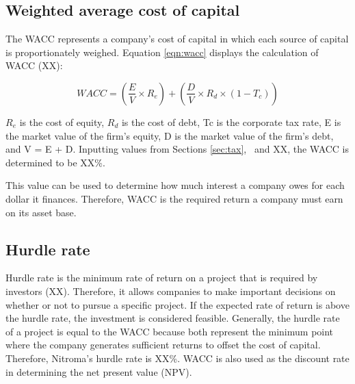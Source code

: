 \subsection{Weighted average cost of capital}
\label{sec:wacc}
The WACC represents a company’s cost of capital in which each source of capital is proportionately weighed. Equation \ref{eqn:wacc} displays the calculation of WACC (XX):

\begin{equation}
\label{eqn:wacc}
    WACC=\left(\frac{E}{V}\times R_{e}\right)+\left(\frac{D}{V}\times R_{d}\times (1-T_{c})\right)
\end{equation}

$R_{e}$ is the cost of equity, $R_{d}$ is the cost of debt, Tc is the corporate tax rate, E is the market value of the firm’s equity, D is the market value of the firm’s debt, and V = E + D. Inputting values from Sections \ref{sec:tax}, \ and XX, the WACC is determined to be XX\%. 

This value can be used to determine how much interest a company owes for each dollar it finances. Therefore, WACC is the required return a company must earn on its asset base. 

\subsection{Hurdle rate}
Hurdle rate is the minimum rate of return on a project that is required by investors (XX). Therefore, it allows companies to make important decisions on whether or not to pursue a specific project. If the expected rate of return is above the hurdle rate, the investment is considered feasible. Generally, the hurdle rate of a project is equal to the WACC because both represent the minimum point where the company generates sufficient returns to offset the cost of capital. Therefore, Nitroma's hurdle rate is XX\%. WACC is also used as the discount rate in determining the net present value (NPV).